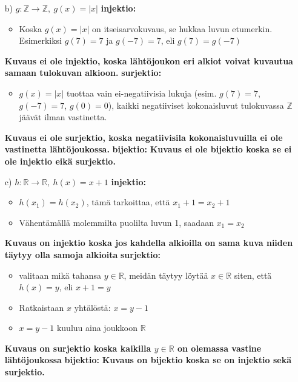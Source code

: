 \documentclass{article}
\begin{document}
\begin{itemize}
            \item[b)] $g : \mathbb{Z} \rightarrow \mathbb{Z}, \ g(x) = |x|$\newline
            \textbf{injektio:}
            \begin{itemize}
                \item Koska $g(x) = |x|$ on itseisarvokuvaus, se hukkaa luvun etumerkin. Esimerkiksi $g(7) = 7$ ja $g(-7) = 7$, eli $g(7) = g(-7)$
            \end{itemize}
            \textbf{Kuvaus ei ole injektio, koska lähtöjoukon eri alkiot voivat kuvautua samaan tulokuvan alkioon.}\newline
            \textbf{surjektio:}
            \begin{itemize}
                \item $g(x) = |x|$ tuottaa vain ei-negatiivisia lukuja (esim. $g(7) = 7$, $g(-7) = 7$, $g(0) = 0$), kaikki negatiiviset kokonaisluvut tulokuvassa $\mathbb{Z}$ jäävät ilman vastinetta.
            \end{itemize}
            \textbf{Kuvaus ei ole surjektio, koska negatiivisila kokonaisluvuilla ei ole vastinetta lähtöjoukossa.}\newline
            \textbf{bijektio:}\newline
            \textbf{Kuvaus ei ole bijektio koska se ei ole injektio eikä surjektio.}
\pagebreak
            \item[c)] $h : \mathbb{R} \rightarrow \mathbb{R}, \ h(x) = x + 1$\newline
            \textbf{injektio:}
            \begin{itemize}
                \item $h(x_1) = h(x_2)$, tämä tarkoittaa, että $x_1 + 1 = x_2 + 1$
                \item Vähentämällä molemmilta puolilta luvun 1, saadaan $x_1 = x_2$
            \end{itemize}
            \textbf{Kuvaus on injektio koska jos kahdella alkioilla on sama kuva niiden täytyy olla samoja alkioita}\newline
            \textbf{surjektio:}
            \begin{itemize}
                \item valitaan mikä tahansa $y \in \mathbb{R}$, meidän täytyy löytää $x \in \mathbb{R}$ siten, että $h(x) = y$, eli $x + 1 = y$
                \item Ratkaistaan $x$ yhtälöstä: $x = y - 1$
                \item $x = y - 1$ kuuluu aina joukkoon $\mathbb{R}$
            \end{itemize}
            \textbf{Kuvaus on surjektio koska kaikilla $y \in \mathbb{R}$ on olemassa vastine lähtöjoukossa}\newline
            \textbf{bijektio:}\newline
            \textbf{Kuvaus on bijektio koska se on injektio sekä surjektio.}
        \end{itemize}
    
\end{document}
